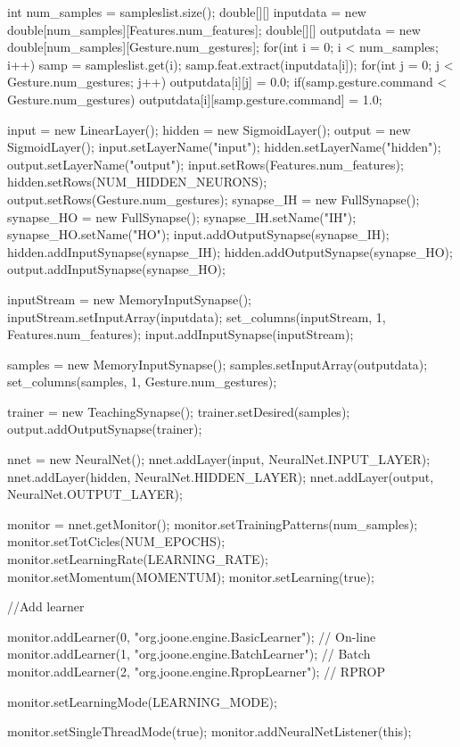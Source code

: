 \documentclass[12pt,a4,notitlepage]{report}
\renewcommand{\_}{\texttt{\symbol{95}}}
\newcommand{\<}{\texttt{\symbol{60}}}
\renewcommand{\>}{\texttt{\symbol{62}}}
\begin{document}
\begin{code}
{{		int num_samples = sampleslist.size();
		double[][] inputdata = new double[num_samples][Features.num_features];
		double[][] outputdata = new double[num_samples][Gesture.num_gestures];
		for(int i = 0; i < num_samples; i++)
		{
			samp = sampleslist.get(i);
			samp.feat.extract(inputdata[i]);
			for(int j = 0; j < Gesture.num_gestures; j++)
				outputdata[i][j] = 0.0;
			if(samp.gesture.command < Gesture.num_gestures)
				outputdata[i][samp.gesture.command] = 1.0;
		}
		
		input = new LinearLayer();
		hidden = new SigmoidLayer();
		output = new SigmoidLayer();
		input.setLayerName("input");
		hidden.setLayerName("hidden");
		output.setLayerName("output");
		input.setRows(Features.num_features);
		hidden.setRows(NUM_HIDDEN_NEURONS);
		output.setRows(Gesture.num_gestures);
		synapse_IH = new FullSynapse();
		synapse_HO = new FullSynapse();
		synapse_IH.setName("IH");
		synapse_HO.setName("HO");
		input.addOutputSynapse(synapse_IH);
		hidden.addInputSynapse(synapse_IH);
		hidden.addOutputSynapse(synapse_HO);
		output.addInputSynapse(synapse_HO);
		
		inputStream = new MemoryInputSynapse();
		inputStream.setInputArray(inputdata);
		set_columns(inputStream, 1, Features.num_features);
		input.addInputSynapse(inputStream);

		samples = new MemoryInputSynapse();
		samples.setInputArray(outputdata);
		set_columns(samples, 1, Gesture.num_gestures);
			
		trainer = new TeachingSynapse();
		trainer.setDesired(samples);
		output.addOutputSynapse(trainer);
			
		nnet = new NeuralNet();
		nnet.addLayer(input, NeuralNet.INPUT_LAYER);
		nnet.addLayer(hidden, NeuralNet.HIDDEN_LAYER);
		nnet.addLayer(output, NeuralNet.OUTPUT_LAYER);
		
		monitor = nnet.getMonitor();
		monitor.setTrainingPatterns(num_samples);
		monitor.setTotCicles(NUM_EPOCHS);
		monitor.setLearningRate(LEARNING_RATE);
		monitor.setMomentum(MOMENTUM);
		monitor.setLearning(true);
		
		//Add learner
		
		monitor.addLearner(0, "org.joone.engine.BasicLearner"); // On-line
		monitor.addLearner(1, "org.joone.engine.BatchLearner"); // Batch
		monitor.addLearner(2, "org.joone.engine.RpropLearner"); // RPROP
		
		monitor.setLearningMode(LEARNING_MODE);
				
		monitor.setSingleThreadMode(true);
		monitor.addNeuralNetListener(this);
			
}}
\end{code}
\end{document}
